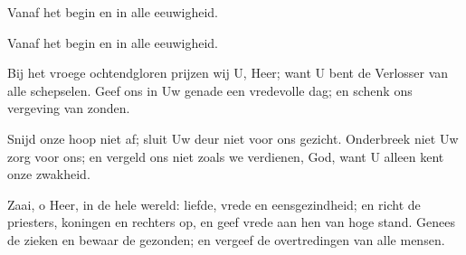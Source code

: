 \documentclass[12pt,twoside,a5paper]{article}
\begin{document}
\begin{doublecols}
  \textsizex

  \dutchl Vanaf het begin en in alle eeuwigheid.

   Vanaf het begin en in alle eeuwigheid.

  \dutchl \begin{halfparskip}
    Bij het vroege ochtendgloren prijzen wij U, Heer; want U bent de Verlosser van alle schepselen. Geef ons in Uw genade een vredevolle dag; en schenk ons vergeving van zonden.
  \end{halfparskip}

   \begin{halfparskip}
  \end{halfparskip}

  \dutchl \begin{halfparskip}
    Snijd onze hoop niet af; sluit Uw deur niet voor ons gezicht. Onderbreek niet Uw zorg voor ons; en vergeld ons niet zoals we verdienen, God, want U alleen kent onze zwakheid.
  \end{halfparskip}

   \begin{halfparskip}
  \end{halfparskip}

  \dutchl \begin{halfparskip}
    Zaai, o Heer, in de hele wereld: liefde, vrede en eensgezindheid; en richt de priesters, koningen en rechters op, en geef vrede aan hen van hoge stand. Genees de zieken en bewaar de gezonden; en vergeef de overtredingen van alle mensen.
  \end{halfparskip}

   \begin{halfparskip}
  \end{halfparskip}
\end{doublecols}
\end{document}
